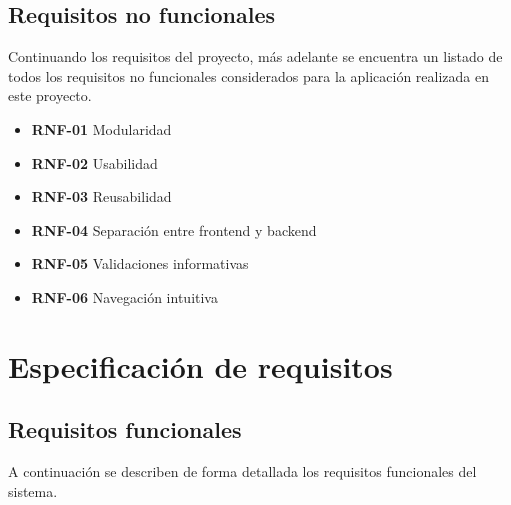 \subsection{Requisitos no funcionales}

Continuando los requisitos del proyecto, más adelante se encuentra un listado de todos los requisitos no funcionales considerados para la aplicación realizada en este proyecto.

\begin{itemize}
    \item \textbf{RNF-01} Modularidad

    \item \textbf{RNF-02} Usabilidad

    \item \textbf{RNF-03} Reusabilidad

    \item \textbf{RNF-04} Separación entre frontend y backend

    \item \textbf{RNF-05} Validaciones informativas

    \item \textbf{RNF-06} Navegación intuitiva
\end{itemize}

\section{Especificación de requisitos}

\subsection{Requisitos funcionales}

A continuación se describen de forma detallada los requisitos funcionales del sistema.

